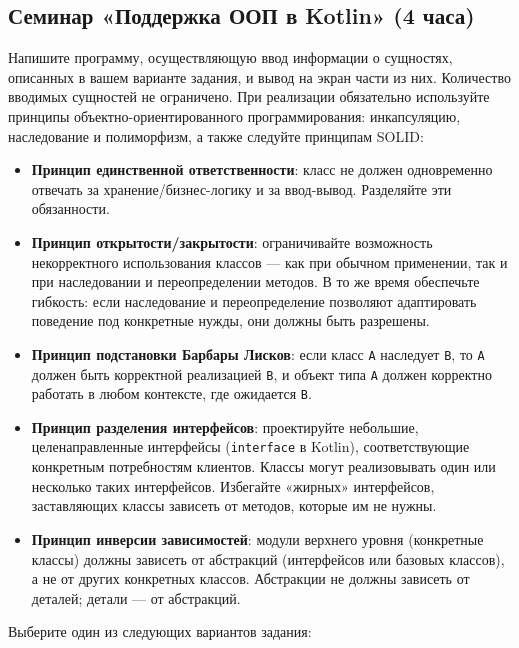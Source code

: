 \subsection{Семинар «Поддержка ООП в Kotlin» (4 часа)}

Напишите программу, осуществляющую ввод информации о сущностях, описанных в вашем варианте задания, и вывод на экран части из них. Количество вводимых сущностей не ограничено. При реализации обязательно используйте принципы объектно-ориентированного программирования: инкапсуляцию, наследование и полиморфизм, а также следуйте принципам SOLID:

\begin{itemize}
 \item \textbf{Принцип единственной ответственности}: класс не должен одновременно отвечать за хранение/бизнес-логику и за ввод-вывод. Разделяйте эти обязанности.
    \item \textbf{Принцип открытости/закрытости}: ограничивайте возможность некорректного использования классов — как при обычном применении, так и при наследовании и переопределении методов. В то же время обеспечьте гибкость: если наследование и переопределение позволяют адаптировать поведение под конкретные нужды, они должны быть разрешены.
    \item \textbf{Принцип подстановки Барбары Лисков}: если класс \texttt{A} наследует \texttt{B}, то \texttt{A} должен быть корректной реализацией \texttt{B}, и объект типа \texttt{A} должен корректно работать в любом контексте, где ожидается \texttt{B}.
\item \textbf{Принцип разделения интерфейсов}: проектируйте небольшие, целенаправленные интерфейсы (\texttt{interface} в Kotlin), соответствующие конкретным потребностям клиентов. Классы могут реализовывать один или несколько таких интерфейсов. Избегайте «жирных» интерфейсов, заставляющих классы зависеть от методов, которые им не нужны.    \item \textbf{Принцип инверсии зависимостей}: модули верхнего уровня (конкретные классы) должны зависеть от абстракций (интерфейсов или базовых классов), а не от других конкретных классов. Абстракции не должны зависеть от деталей; детали — от абстракций.
\end{itemize}

\medskip

Выберите один из следующих вариантов задания:

